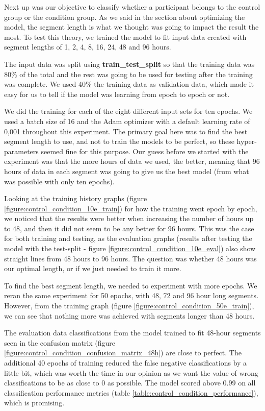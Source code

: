 Next up was our objective to classify whether a participant belongs to the control group or the condition group. As we said in the section about optimizing the model, the segment length is what we thought was going to impact the result the most. To test this theory, we trained the model to fit input data created with segment lengths of 1, 2, 4, 8, 16, 24, 48 and 96 hours. 

The input data was split using \textbf{train\_test\_split} so that the training data was 80\% of the total and the rest was going to be used for testing after the training was complete. We used 40\% the training data as validation data, which made it easy for us to tell if the model was learning from epoch to epoch or not. 

We did the training for each of the eight different input sets for ten epochs. We used a batch size of 16 and the Adam optimizer with a default learning rate of 0,001 throughout this experiment. The primary goal here was to find the best segment length to use, and not to train the models to be perfect, so these hyper-parameters seemed fine for this purpose. Our guess before we started with the experiment was that the more hours of data we used, the better, meaning that 96 hours of data in each segment was going to give us the best model (from what was possible with only ten epochs).

Looking at the training history graphs (figure \ref{figure:control_condition_10e_train}) for how the training went epoch by epoch, we noticed that the results were better when increasing the number of hours up to 48, and then it did not seem to be any better for 96 hours. This was the case for both training and testing, as the evaluation graphs (results after testing the model with the test-split - figure \ref{figure:control_condition_10e_eval}) also show straight lines from 48 hours to 96 hours. The question was whether 48 hours was our optimal length, or if we just needed to train it more.

To find the best segment length, we needed to experiment with more epochs. We reran the same experiment for 50 epochs, with 48, 72 and 96 hour long segments. However, from the training graph (figure \ref{figure:control_condition_50e_train}), we can see that nothing more was achieved with segments longer than 48 hours. 

The evaluation data classifications from the model trained to fit 48-hour segments seen in the confusion matrix (figure \ref{figure:control_condition_confusion_matrix_48h}) are close to perfect. The additional 40 epochs of training reduced the false negative classifications by a little bit, which was worth the time in our opinion as we want the value of wrong classifications to be as close to 0 as possible. The model scored above 0.99 on all classification performance metrics (table \ref{table:control_condition_performance}), which is promising.


